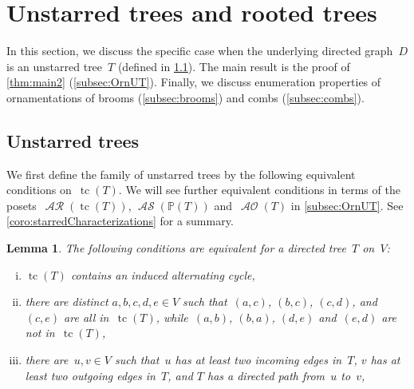 \documentclass{amsart}
\newtheorem{lemma}[theorem]{Lemma}
\theoremstyle{definition}
\renewcommand{\c}[1]{\mathcal{#1}} %
\DeclareMathOperator{\tc}{tc} %
\DeclareMathOperator{\AOrn}{\c{AO}}  %
\DeclareMathOperator{\AReori}{\c{AR}}  %
\DeclareMathOperator{\ASour}{\mathcal{AS}}  %
\newcommand{\PP}{\mathbb P} %
\begin{document}
\section{Unstarred trees and rooted trees}
\label{sec:unstarredTrees}

In this section, we discuss the specific case when the underlying directed graph~$D$ is an unstarred tree~$T$ (defined in \cref{subsec:unstarredTrees}).
The main result is the proof of \cref{thm:main2} (\cref{subsec:OrnUT}).
Finally, we discuss enumeration properties of ornamentations of brooms (\cref{subsec:brooms}) and combs (\cref{subsec:combs}).


\subsection{Unstarred trees}
\label{subsec:unstarredTrees}


We first define the family of unstarred trees by the following equivalent conditions on~$\tc(T)$.
We will see further equivalent conditions in terms of the posets~$\AReori(\tc(T))$, $\ASour(\PP(T))$ and~$\AOrn(T)$ in \cref{subsec:OrnUT}.
See \cref{coro:starredCharacterizations} for a summary.

\begin{lemma}
\label{lem:starredCharacterization}
The following conditions are equivalent for a directed tree~$T$ on~$V$:
\begin{enumerate}[(i)]
\item $\tc(T)$ contains an induced alternating cycle,
\item there are distinct $a,b,c,d,e \in V$ such that~$(a,c)$, $(b,c)$, $(c,d)$, and~$(c,e)$ are all in~$\tc(T)$, while~$(a,b)$, $(b,a)$, $(d,e)$ and~$(e,d)$ are not in~$\tc(T)$,
\item there are~$u,v \in V$ such that~$u$ has at least two incoming edges in~$T$, $v$ has at least two outgoing edges in~$T$, and $T$ has a directed path from~$u$ to~$v$,
\end{enumerate}
\end{lemma}
\end{document}
